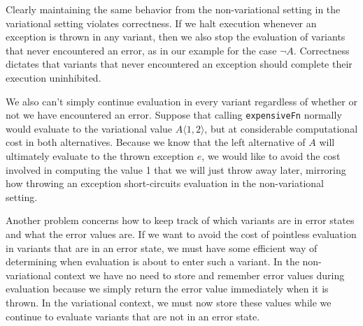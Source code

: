 \documentclass[letterpaper,10pt,onecolumn]{article}
\begin{document}
Clearly maintaining the same behavior from the non-variational setting in the variational setting
violates correctness. If we halt execution whenever an exception is
thrown in any variant, then we also stop the evaluation of variants that never encountered an error,
as in our example for the case $\neg A$. Correctness dictates that variants that never encountered
an exception should complete their execution uninhibited.

We also can't simply continue evaluation
in every variant regardless of whether or not we have encountered an error.
Suppose that calling \texttt{expensiveFn} normally would evaluate to the variational value $A\langle 1, 2 \rangle$, but at considerable computational cost in both alternatives.
Because we know that the left alternative of $A$ will ultimately evaluate to the thrown exception $e$, we would
like to avoid the cost involved in computing the value 1 that we will just throw away later, mirroring how throwing an exception short-circuits evaluation in the
non-variational setting. 

Another problem concerns how to keep track of which variants are in error states and what
the error values are. If we want to avoid the cost of pointless evaluation in variants that are in an error
state, we must have some efficient way of determining when evaluation is about to enter such a variant.
In the non-variational context we have no need to store and remember error values during evaluation
because we simply return the error value immediately when it is thrown. In the variational context, we
must now store these values while we continue to evaluate variants that are not in an error state.



\end{document}
